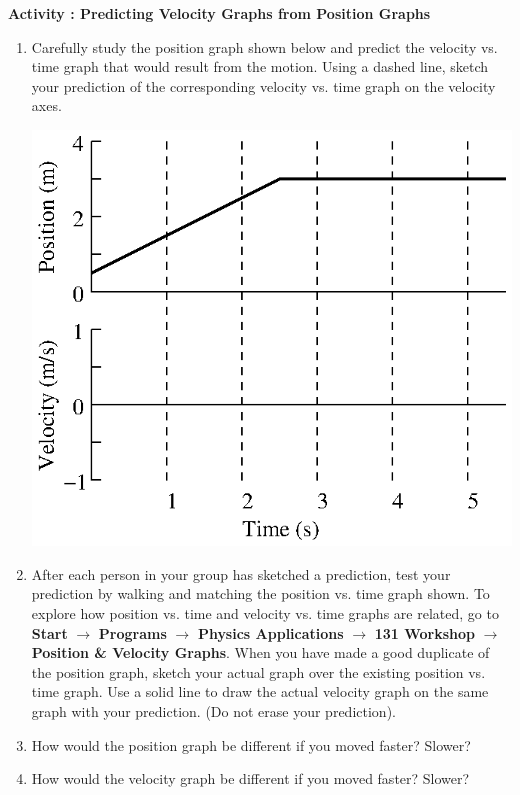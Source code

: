 \newpage

\textbf{Activity : Predicting Velocity Graphs from Position Graphs}

\begin{enumerate}

\item Carefully study the position graph shown below and predict the velocity
vs. time graph that would result from the motion. Using a dashed line, sketch
your prediction of the corresponding velocity vs. time graph on the velocity
axes.

\vspace{0.3cm}
{\par\centering \includegraphics{iqsRelatingMotion/relating_fig1.eps} \par}
\vspace{0.3cm}

\item After each person in your group has sketched a prediction, test your prediction
by walking and matching the position vs. time graph shown. 
To explore how position vs. time and velocity vs. time graphs are related, 
go to \textbf{Start} $\rightarrow$ \textbf{Programs} $\rightarrow$ \textbf{Physics Applications} $
\rightarrow$ \textbf{131 Workshop} $\rightarrow$ \textbf{Position \& Velocity Graphs}.
When you have made a good duplicate
of the position graph, sketch your actual graph over the existing position vs.
time graph.
Use a solid line to draw the actual velocity graph on the same graph with
your prediction. (Do not erase your prediction).

\item How would the position graph be different if you moved faster? Slower? 
\vspace{20mm}

\item How would the velocity graph be different if you moved faster? Slower? 
\vspace{20mm}

\end{enumerate}

